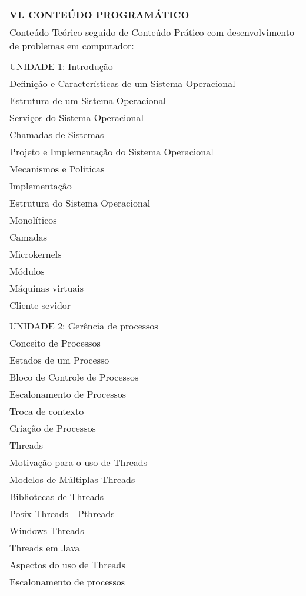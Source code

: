 \documentclass[12pt]{article}
\begin{document}
\begin{longtable}{|L{1.025\textwidth}|} \hline
%
{\bf VI. CONTEÚDO PROGRAMÁTICO } \\ \hline
Conteúdo Teórico seguido de Conteúdo Prático com desenvolvimento de problemas em computador: \\
\\
UNIDADE 1: Introdução \\%
Definição e Características de um Sistema Operacional\\
Estrutura de um Sistema Operacional\\
Serviços do Sistema Operacional\\
Chamadas de Sistemas\\
Projeto e Implementação do Sistema Operacional\\
Mecanismos e Políticas\\
Implementação\\
Estrutura do Sistema Operacional\\
Monolíticos\\
Camadas\\
Microkernels\\
Módulos\\
Máquinas virtuais\\
Cliente-sevidor\\
\\
UNIDADE 2: Gerência de processos\\ %
Conceito de Processos\\
Estados de um Processo\\
Bloco de Controle de Processos\\
Escalonamento de Processos\\
Troca de contexto\\
Criação de Processos\\
Threads\\
Motivação para o uso de Threads\\
Modelos de Múltiplas Threads\\
Bibliotecas de Threads\\
Posix Threads - Pthreads\\
Windows Threads\\
Threads em Java\\
Aspectos do uso de Threads\\
Escalonamento de processos\\

\end{longtable}
\end{document}
